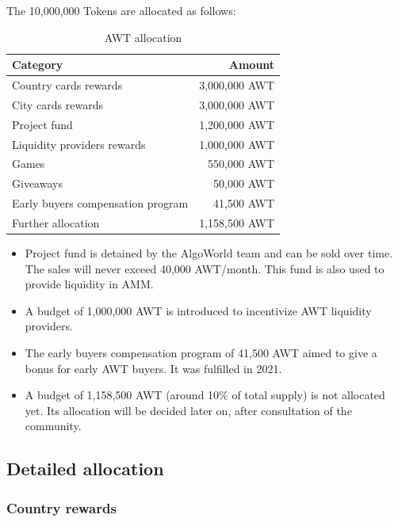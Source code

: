 \documentclass{article}
\begin{document}
The 10,000,000 Tokens are allocated as follows:
\begin{table}[ht]
\centering
\begin{tabular}{l|r}
Category & Amount \\\hline
Country cards rewards & 3,000,000 AWT \\
City cards rewards & 3,000,000 AWT\\
Project fund & 1,200,000 AWT\\
Liquidity providers rewards & 1,000,000 AWT\\
Games & 550,000 AWT\\
Giveaways & 50,000 AWT\\
Early buyers compensation program & 41,500 AWT\\
Further allocation & 1,158,500 AWT
\end{tabular}
\caption{\label{tab:widgets}AWT allocation}
\end{table}

\begin{itemize}
\item Project fund is detained by the AlgoWorld team and can be sold over time. The sales will never exceed 40,000 AWT/month. This fund is also used to provide liquidity in AMM.
\item A budget of 1,000,000 AWT is introduced to incentivize AWT liquidity providers.
\item The early buyers compensation program of 41,500 AWT aimed to give a bonus for early AWT buyers. It was fulfilled in 2021.
\item A budget of 1,158,500 AWT (around 10\% of total supply) is not allocated yet. Its allocation will be decided later on, after consultation of the community.
\end{itemize}

\newpage

\subsection{Detailed allocation}
\label{ssec:detailed-allocation}

\subsubsection{Country rewards}
\label{sssec:country-rewards}
\end{document}

